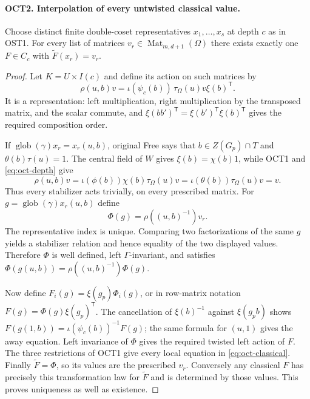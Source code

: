 \documentclass[11pt,a4paper]{article}
\numberwithin{equation}{section}
\theoremstyle{remark}\newtheorem{remark}[theorem]{Remark}
\begin{document}
\paragraph{OCT2. Interpolation of every untwisted classical value.}
\label{claim:OCT2}
Choose distinct finite double-coset representatives $x_1,\ldots,\allowbreak{} x_s$
at depth $c$ as in OST1.  For every list of matrices
$v_r\in\operatorname{Mat}_{m,\allowbreak{} d+1}(\Omega)$ there exists exactly
one $F\in C_c$ with $\widetilde F(x_r)=v_r$.
\begin{proof}
Let $K=U\times I(c)$ and define its action on such matrices by
\[
 \rho(u,\allowbreak{} b)v=\iota(\psi_c(b))\,
                   \tau_\Omega(u)v\xi(b)^{\mathsf T}.
\]
It is a representation: left multiplication, right multiplication
by the transposed matrix, and the scalar commute, and
$\xi(bb')^{\mathsf T}=\xi(b')^{\mathsf T}\xi(b)^{\mathsf T}$
gives the required composition order.

If $\operatorname{glob}(\gamma)x_r=x_r(u,\allowbreak{} b)$, original Free
says that $b\in Z(G_p)\cap T$ and
$\theta(b)\tau(u)=1$.  The central field of $W$ gives
$\xi(b)=\chi(b)1$, while OCT1 and \eqref{eq:oct-depth} give
\[
 \rho(u,\allowbreak{} b)v=\iota(\phi(b))\chi(b)\tau_\Omega(u)v
                       =\iota(\theta(b))\tau_\Omega(u)v=v.
\]
Thus every stabilizer acts trivially, on every prescribed matrix.
For $g=\operatorname{glob}(\gamma)x_r(u,\allowbreak{} b)$ define
\[
                 \Phi(g)=\rho((u,\allowbreak{} b)^{-1})v_r.
\]
The representative index is unique.  Comparing two factorizations
of the same $g$ yields a stabilizer relation and hence equality of
the two displayed values.  Therefore $\Phi$ is well defined, left
$\Gamma$-invariant, and satisfies
$\Phi(g(u,\allowbreak{} b))=\rho((u,\allowbreak{} b)^{-1})\Phi(g)$.

Now define $F_i(g)=\xi(g_p)\Phi_i(g)$, or in row-matrix notation
$F(g)=\Phi(g)\xi(g_p)^{\mathsf T}$.  The cancellation of
$\xi(b)^{-1}$ against $\xi(g_pb)$ shows
$F(g(1,\allowbreak{} b))=\iota(\psi_c(b))^{-1}F(g)$; the same formula for
$(u,1)$ gives the away equation.  Left invariance of $\Phi$ gives
the required twisted left action of $F$.  The three restrictions
of OCT1 give every local equation in \eqref{eq:oct-classical}.
Finally $\widetilde F=\Phi$, so its values are the prescribed
$v_r$.  Conversely any classical $F$ has precisely this
transformation law for $\widetilde F$ and is determined by those
values.  This proves uniqueness as well as existence.
\end{proof}
\end{document}
